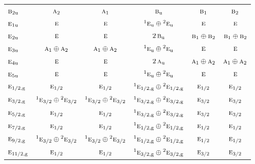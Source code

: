 \documentclass[10pt,a4paper]{article}
\numberwithin{equation}{section}
\newcommand{\irr}[1]{\text{\normalfont\scshape #1}}
\newcommand{\conjpair}[1]{{}^{#1}}
\newcommand{\ptag}[1]{\mathrm{#1}}
\begin{document}
{\begin{longtable}{@{}lccccc@{}}
$\irr{b}_{2\ptag{u}}$ & $\irr{a}_{2}$ & $\irr{a}_{1}$ & $\irr{b}_{\ptag{u}}$ & $\irr{b}_{1}$ & $\irr{b}_{2}$\\
$\irr{e}_{1\ptag{u}}$ & $\irr{e}$ & $\irr{e}$ & $\conjpair{1}\irr{e}_{\ptag{u}}\oplus \conjpair{2}\irr{e}_{\ptag{u}}$ & $\irr{e}$ & $\irr{e}$\\
$\irr{e}_{2\ptag{u}}$ & $\irr{e}$ & $\irr{e}$ & $2\,\irr{b}_{\ptag{u}}$ & $\irr{b}_{1}\oplus \irr{b}_{2}$ & $\irr{b}_{1}\oplus \irr{b}_{2}$\\
$\irr{e}_{3\ptag{u}}$ & $\irr{a}_{1}\oplus \irr{a}_{2}$ & $\irr{a}_{1}\oplus \irr{a}_{2}$ & $\conjpair{1}\irr{e}_{\ptag{u}}\oplus \conjpair{2}\irr{e}_{\ptag{u}}$ & $\irr{e}$ & $\irr{e}$\\
$\irr{e}_{4\ptag{u}}$ & $\irr{e}$ & $\irr{e}$ & $2\,\irr{a}_{\ptag{u}}$ & $\irr{a}_{1}\oplus \irr{a}_{2}$ & $\irr{a}_{1}\oplus \irr{a}_{2}$\\
$\irr{e}_{5\ptag{u}}$ & $\irr{e}$ & $\irr{e}$ & $\conjpair{1}\irr{e}_{\ptag{u}}\oplus \conjpair{2}\irr{e}_{\ptag{u}}$ & $\irr{e}$ & $\irr{e}$\\
$\irr{e}_{1/2,\ptag{g}}$ & $\irr{e}_{1/2}$ & $\irr{e}_{1/2}$ & $\conjpair{1}\irr{e}_{1/2,\ptag{g}}\oplus \conjpair{2}\irr{e}_{1/2,\ptag{g}}$ & $\irr{e}_{1/2}$ & $\irr{e}_{1/2}$\\
$\irr{e}_{3/2,\ptag{g}}$ & $\conjpair{1}\irr{e}_{3/2}\oplus \conjpair{2}\irr{e}_{3/2}$ & $\conjpair{1}\irr{e}_{3/2}\oplus \conjpair{2}\irr{e}_{3/2}$ & $\conjpair{1}\irr{e}_{3/2,\ptag{g}}\oplus \conjpair{2}\irr{e}_{3/2,\ptag{g}}$ & $\irr{e}_{3/2}$ & $\irr{e}_{3/2}$\\
$\irr{e}_{5/2,\ptag{g}}$ & $\irr{e}_{1/2}$ & $\irr{e}_{1/2}$ & $\conjpair{1}\irr{e}_{3/2,\ptag{g}}\oplus \conjpair{2}\irr{e}_{3/2,\ptag{g}}$ & $\irr{e}_{3/2}$ & $\irr{e}_{3/2}$\\
$\irr{e}_{7/2,\ptag{g}}$ & $\irr{e}_{1/2}$ & $\irr{e}_{1/2}$ & $\conjpair{1}\irr{e}_{1/2,\ptag{g}}\oplus \conjpair{2}\irr{e}_{1/2,\ptag{g}}$ & $\irr{e}_{1/2}$ & $\irr{e}_{1/2}$\\
$\irr{e}_{9/2,\ptag{g}}$ & $\conjpair{1}\irr{e}_{3/2}\oplus \conjpair{2}\irr{e}_{3/2}$ & $\conjpair{1}\irr{e}_{3/2}\oplus \conjpair{2}\irr{e}_{3/2}$ & $\conjpair{1}\irr{e}_{1/2,\ptag{g}}\oplus \conjpair{2}\irr{e}_{1/2,\ptag{g}}$ & $\irr{e}_{1/2}$ & $\irr{e}_{1/2}$\\
$\irr{e}_{11/2,\ptag{g}}$ & $\irr{e}_{1/2}$ & $\irr{e}_{1/2}$ & $\conjpair{1}\irr{e}_{3/2,\ptag{g}}\oplus \conjpair{2}\irr{e}_{3/2,\ptag{g}}$ & $\irr{e}_{3/2}$ & $\irr{e}_{3/2}$\\

\end{longtable}}
\end{document}
